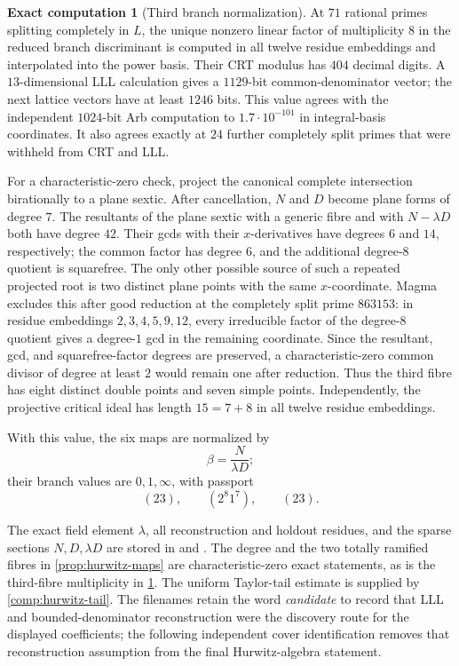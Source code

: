 \documentclass[11pt]{amsart}
\theoremstyle{definition}
\newtheorem{computation}[computation]{Exact computation}
\theoremstyle{remark}
\begin{document}
\begin{computation}[Third branch normalization]
\label{comp:third-branch}
At $71$ rational primes splitting completely in $L$, the unique nonzero
linear factor of multiplicity $8$ in the reduced branch discriminant is
computed in all twelve residue embeddings and interpolated into the power
basis.  Their CRT modulus has $404$ decimal digits.  A $13$-dimensional LLL
calculation \cite{LLL} gives a $1129$-bit common-denominator vector; the next lattice
vectors have at least $1246$ bits.  This value agrees with the independent
$1024$-bit Arb computation to $1.7\cdot10^{-101}$ in integral-basis
coordinates.  It also agrees exactly at $24$ further completely split primes
that were withheld from CRT and LLL.

\smallskip
For a characteristic-zero check, project the canonical complete intersection
birationally to a plane sextic.  After cancellation, $N$ and $D$ become plane
forms of degree $7$.  The resultants of the plane sextic with a generic fibre
and with $N-\lambda D$ both have degree $42$.  Their gcds with their
$x$-derivatives have degrees $6$ and $14$, respectively; the common factor has
degree $6$, and the additional degree-$8$ quotient is squarefree.  The only
other possible source of such a repeated projected root is two distinct plane
points with the same $x$-coordinate.  Magma excludes this after good reduction
at the completely split prime $863153$: in residue embeddings
$2,3,4,5,9,12$, every irreducible factor of the degree-$8$ quotient gives a
degree-$1$ gcd in the remaining coordinate.  Since the resultant, gcd, and
squarefree-factor degrees are preserved, a characteristic-zero common divisor
of degree at least $2$ would remain one after reduction.  Thus the third fibre
has eight distinct double points and seven simple points.  Independently, the
projective critical ideal has length $15=7+8$ in all twelve residue embeddings.

\smallskip
With this value, the six maps are normalized by
\[
 \beta=\frac{N}{\lambda D};
\]
their branch values are $0,1,\infty$, with passport
\[
 (23),\qquad (2^8 1^7),\qquad (23).
\]
\end{computation}

The exact field element $\lambda$, all reconstruction and holdout residues,
and the sparse sections $N,D,\lambda D$ are stored in
 and
.  The degree and the two totally
ramified fibres in \cref{prop:hurwitz-maps} are characteristic-zero exact
statements, as is the third-fibre multiplicity in
\cref{comp:third-branch}.  The uniform Taylor-tail estimate is supplied by
\cref{comp:hurwitz-tail}.  The filenames retain the word \emph{candidate} to
record that LLL and bounded-denominator reconstruction were the discovery
route for the displayed coefficients; the following independent cover
identification removes that reconstruction assumption from the final
Hurwitz-algebra statement.
\end{document}
